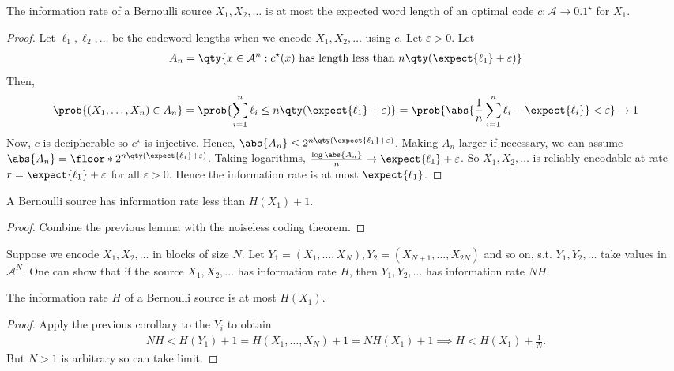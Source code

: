 \begin{lemma}
    The information rate of a Bernoulli source $X_1, X_2, \dots$ is at most the expected word length of an optimal code $c \colon \mathcal A \to \qty{0,1}^\star$ for $X_1$.
\end{lemma}

\begin{proof}
    Let $\ell_1, \ell_2, \dots$ be the codeword lengths when we encode $X_1, X_2, \dots$ using $c$.
    Let $\varepsilon > 0$.
    Let
    \begin{align*}
        A_n = \qty{x \in \mathcal A^n : c^\star(x) \text{ has length less than } n \qty(\expect{\ell_1} + \varepsilon)}
    \end{align*}
    Then,
    \begin{align*}
        \prob{(X_1, \dots, X_n) \in A_n} = \prob{\sum_{i=1}^n \ell_i \leq n \qty(\expect{\ell_1} + \varepsilon)} = \prob{\abs{\frac{1}{n} \sum_{i=1}^n \ell_i - \expect{\ell_i}} < \varepsilon} \to 1
    \end{align*}
    Now, $c$ is decipherable so $c^\star$ is injective.
    Hence, $\abs{A_n} \leq 2^{n\qty(\expect{\ell_1} + \varepsilon)}$.
    Making $A_n$ larger if necessary, we can assume $\abs{A_n} = \floor*{2^{n\qty(\expect{\ell_1} + \varepsilon)}}$.
    Taking logarithms, $\frac{\log \abs{A_n}}{n} \to \expect{\ell_1} + \varepsilon$.
    So $X_1, X_2, \dots$ is reliably encodable at rate $r = \expect{\ell_1} + \varepsilon$ for all $\varepsilon > 0$.
    Hence the information rate is at most $\expect{\ell_1}$.
\end{proof}
\begin{corollary}
    A Bernoulli source has information rate less than $H(X_1) + 1$.
\end{corollary}
\begin{proof}
    Combine the previous lemma with the noiseless coding theorem.
\end{proof}
Suppose we encode $X_1, X_2, \dots$ in blocks of size $N$.
Let $Y_1 = (X_1, \dots, X_N), Y_2 = (X_{N+1}, \dots, X_{2N})$ and so on, s.t. $Y_1, Y_2, \dots$ take values in $\mathcal A^N$.
One can show that if the source $X_1, X_2, \dots$ has information rate $H$, then $Y_1, Y_2, \dots$ has information rate $NH$.
\begin{proposition}
    The information rate $H$ of a Bernoulli source is at most $H(X_1)$.
\end{proposition}
\begin{proof}
    Apply the previous corollary to the $Y_i$ to obtain
    \begin{align*}
        NH < H(Y_1) + 1 = H(X_1, \dots, X_N) + 1 = NH(X_1) + 1 \implies H < H(X_1) + \frac{1}{N}.
    \end{align*}
    But $N > 1$ is arbitrary so can take limit.
\end{proof}

